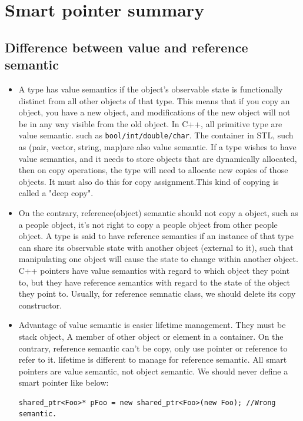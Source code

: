 \documentclass[a4paper,11pt,twoside]{book}
\begin{document}
\section{Smart pointer summary}

\subsection{Difference between value and reference semantic}
\begin{itemize}
	\item A type has value semantics if the object's observable state is functionally distinct from all other objects of that type. This means that if you copy an object, you have a new object, and modifications of the new object will not be in any way visible from the old object. In C++, all primitive type are value semantic. such as \texttt{bool/int/double/char}. The container in STL, such as (pair, vector, string, map)are also value semantic. If a type wishes to have value semantics, and it needs to store objects that are dynamically allocated, then on copy operations, the type will need to allocate new copies of those objects. It must also do this for copy assignment.This kind of copying is called a "deep copy".
	
	\item On the contrary, reference(object) semantic should not copy a object, such as a people object, it's not right to copy a people object from other people object. A type is said to have reference semantics if an instance of that type can share its observable state with another object (external to it), such that manipulating one object will cause the state to change within another object. C++ pointers have value semantics with regard to which object they point to, but they have reference semantics with regard to the state of the object they point to. Usually, for reference semnatic class, we should delete its copy constructor. 
	
	\item Advantage of value semantic is easier lifetime management. They must be stack object, A member of other object or element in a container. On the contrary, reference semantic can't be copy, only use pointer or reference to refer to it. lifetime is different to manage for reference semantic. All smart pointers are value semantic, not object semantic. We should never define a smart pointer like below:
	\begin{lstlisting}[numbers=none]
		shared_ptr<Foo>* pFoo = new shared_ptr<Foo>(new Foo); //Wrong semantic.
	\end{lstlisting}
	

\end{itemize}
\end{document}
